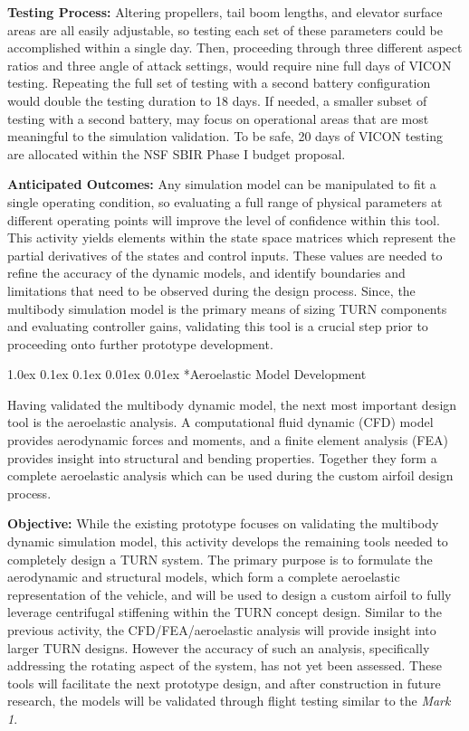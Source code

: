 \documentclass[11pt]{article}
\makeatletter
\renewcommand\subsection{
\@startsection{subsection}{2}{\z@}%
{1.0ex \@plus 0.1ex \@minus 0.1ex}%
{0.01ex \@plus 0.01ex}%
{\normalfont\Large\bfseries}}
\makeatother
\begin{document}
{\bf Testing Process:}
Altering propellers, tail boom lengths, and elevator surface areas are all easily adjustable, so testing each set of these parameters could be accomplished within a single day.  Then, proceeding through three different aspect ratios and three angle of attack settings, would require nine full days of VICON testing.  Repeating the full set of testing with a second battery configuration would double the testing duration to 18 days.  If needed, a smaller subset of testing with a second battery, may focus on operational areas that are most meaningful to the simulation validation.  To be safe, 20 days of VICON testing are allocated within the NSF SBIR Phase I budget proposal.


{\bf Anticipated Outcomes:}
Any simulation model can be manipulated to fit a single operating condition, so evaluating a full range of physical parameters at different operating points will improve the level of confidence within this tool.  This activity yields elements within the state space matrices which represent the partial derivatives of the states and control inputs.  These values are needed to refine the accuracy of the dynamic models, and identify boundaries and limitations that need to be observed during the design process.  Since, the multibody simulation model is the primary means of sizing TURN components and evaluating controller gains, validating this tool is a crucial step prior to proceeding onto further prototype development.




\subsection*{Aeroelastic Model Development}

Having validated the multibody dynamic model, the next most important design tool is the aeroelastic analysis.  A computational fluid dynamic (CFD) model provides aerodynamic forces and moments, and a finite element analysis (FEA) provides insight into structural and bending properties.  Together they form a complete aeroelastic analysis which can be used during the custom airfoil design process.


{\bf Objective:}
While the existing prototype focuses on validating the multibody dynamic simulation model, this activity develops the remaining tools needed to completely design a TURN system.  The primary purpose is to formulate the aerodynamic and structural models, which form a complete aeroelastic representation of the vehicle, and will be used to design a custom airfoil to fully leverage centrifugal stiffening within the TURN concept design.  Similar to the previous activity, the CFD/FEA/aeroelastic analysis will provide insight into larger TURN designs.  However the accuracy of such an analysis, specifically addressing the rotating aspect of the system, has not yet been assessed.  These tools will facilitate the next prototype design, and after construction in future research, the models will be validated through flight testing similar to the \emph{Mark 1}.
\end{document}
